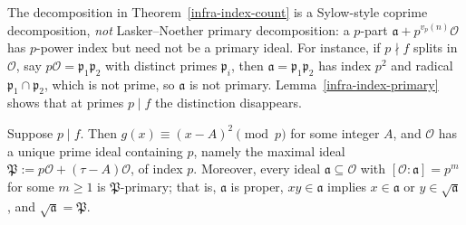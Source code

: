 \begin{remark}\label{infra-index-not-primary}
  The decomposition in Theorem~\ref{infra-index-count} is a Sylow-style coprime
  decomposition, \emph{not} Lasker--Noether primary decomposition: a $p$-part
  $\mathfrak{a} + p^{v_p(n)}\mathcal{O}$ has $p$-power index but need not be a primary
  ideal. For instance, if $p \nmid f$ splits in $\mathcal{O}$, say
  $p\mathcal{O} = \mathfrak{p}_1\mathfrak{p}_2$ with distinct primes $\mathfrak{p}_i$, then
  $\mathfrak{a} = \mathfrak{p}_1\mathfrak{p}_2$ has index $p^2$ and radical
  $\mathfrak{p}_1 \cap \mathfrak{p}_2$, which is not prime, so $\mathfrak{a}$ is not
  primary. Lemma~\ref{infra-index-primary} shows that at primes $p \mid f$ the distinction
  disappears.
\end{remark}

\begin{lemma}\label{infra-index-primary}
  \leanok
  Suppose $p \mid f$. Then $g(x) \equiv (x - A)^2 \pmod p$ for some integer $A$, and
  $\mathcal{O}$ has a unique prime ideal containing $p$, namely the maximal ideal
  $\mathfrak{P} := p\mathcal{O} + (\tau - A)\mathcal{O}$, of index $p$. Moreover, every
  ideal $\mathfrak{a} \subseteq \mathcal{O}$ with $[\mathcal{O} : \mathfrak{a}] = p^m$ for
  some $m \ge 1$ is $\mathfrak{P}$-primary; that is, $\mathfrak{a}$ is proper,
  $xy \in \mathfrak{a}$ implies $x \in \mathfrak{a}$ or $y \in \sqrt{\mathfrak{a}}$, and
  $\sqrt{\mathfrak{a}} = \mathfrak{P}$.
\end{lemma}

